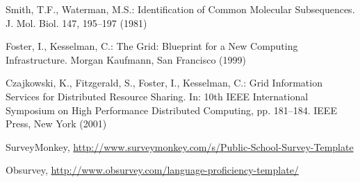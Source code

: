 \documentclass[runningheads]{llncs}
\begin{document}
\begin{thebibliography}{4}

 Smith, T.F., Waterman, M.S.: Identification of Common Molecular
Subsequences. J. Mol. Biol. 147, 195--197 (1981)

 Foster, I., Kesselman, C.: The Grid: Blueprint for a New Computing
Infrastructure. Morgan Kaufmann, San Francisco (1999)

 Czajkowski, K., Fitzgerald, S., Foster, I., Kesselman, C.: Grid
Information Services for Distributed Resource Sharing. In: 10th IEEE
International Symposium on High Performance Distributed Computing, pp.
181--184. IEEE Press, New York (2001)

SurveyMonkey, \url{http://www.surveymonkey.com/s/Public-School-Survey-Template}

Obsurvey, \url{http://www.obsurvey.com/language-proficiency-template/}

\end{thebibliography}
\end{document}
